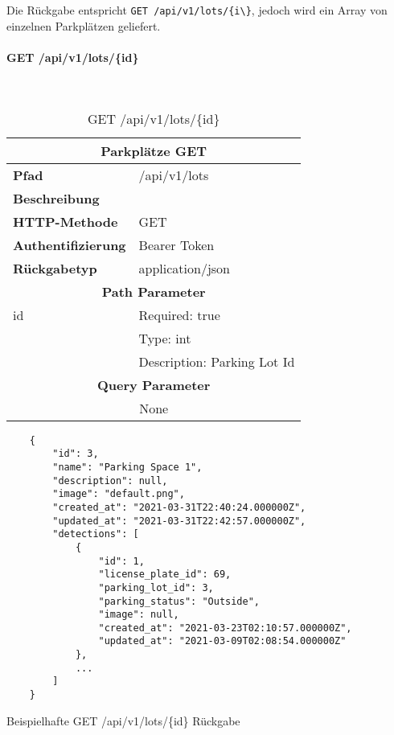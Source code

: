 Die Rückgabe entspricht \verb|GET /api/v1/lots/{i\}|, jedoch wird ein
Array von einzelnen Parkplätzen geliefert.

\paragraph{GET /api/v1/lots/\{id\}}\mbox{}\\

\begin{table}[H]
  \centering
  \begin{tabular}{|l|l|}
  \hline
  \multicolumn{2}{|c|}{\textbf{Parkplätze GET}}         \\ \hline
  \textbf{Pfad}              & /api/v1/lots        \\ \hline
  \textbf{Beschreibung}      &                           \\ \hline
  \textbf{HTTP-Methode}      & GET                       \\ \hline
  \textbf{Authentifizierung} & Bearer Token              \\ \hline
  \textbf{Rückgabetyp}       & application/json          \\ \hline
  \multicolumn{2}{|c|}{\textbf{Path Parameter}}          \\ \hline
  id                         & Required: true            \\ \hline
                             & Type: int                 \\ \hline
                             & Description: Parking Lot Id \\ \hline
  \multicolumn{2}{|c|}{\textbf{Query Parameter}}                      \\ \hline
  \multicolumn{2}{|c|}{None}          \\ \hline
  \end{tabular}
  \caption{GET /api/v1/lots/\{id\}}
\end{table}

\begin{listing}[H]
  \begin{verbatim}
    {
        "id": 3,
        "name": "Parking Space 1",
        "description": null,
        "image": "default.png",
        "created_at": "2021-03-31T22:40:24.000000Z",
        "updated_at": "2021-03-31T22:42:57.000000Z",
        "detections": [
            {
                "id": 1,
                "license_plate_id": 69,
                "parking_lot_id": 3,
                "parking_status": "Outside",
                "image": null,
                "created_at": "2021-03-23T02:10:57.000000Z",
                "updated_at": "2021-03-09T02:08:54.000000Z"
            },
            ...
        ]
    }
  \end{verbatim}
  \caption{Beispielhafte GET /api/v1/lots/\{id\} Rückgabe}
\end{listing}

